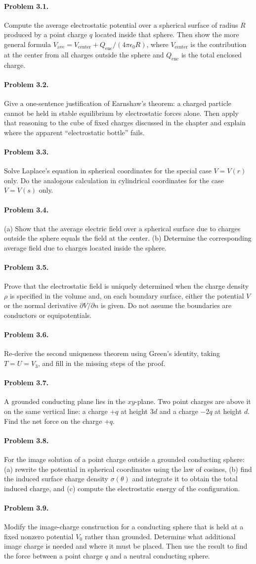 \documentclass{aa}
\newcommand{\problemstatement}[2]{%
\paragraph{Problem #1.}#2\par\medskip
}
\begin{document}
\problemstatement{3.1}{Compute the average electrostatic potential over a spherical surface of radius \(R\) produced by a point charge \(q\) located inside that sphere. Then show the more general formula \(V_{\mathrm{ave}} = V_{\mathrm{center}} + Q_{\mathrm{enc}}/(4\pi\epsilon_0 R)\), where \(V_{\mathrm{center}}\) is the contribution at the center from all charges outside the sphere and \(Q_{\mathrm{enc}}\) is the total enclosed charge.}
\problemstatement{3.2}{Give a one-sentence justification of Earnshaw's theorem: a charged particle cannot be held in stable equilibrium by electrostatic forces alone. Then apply that reasoning to the cube of fixed charges discussed in the chapter and explain where the apparent ``electrostatic bottle'' fails.}
\problemstatement{3.3}{Solve Laplace's equation in spherical coordinates for the special case \(V = V(r)\) only. Do the analogous calculation in cylindrical coordinates for the case \(V = V(s)\) only.}
\problemstatement{3.4}{(a) Show that the average electric field over a spherical surface due to charges outside the sphere equals the field at the center. (b) Determine the corresponding average field due to charges located inside the sphere.}
\problemstatement{3.5}{Prove that the electrostatic field is uniquely determined when the charge density \(\rho\) is specified in the volume and, on each boundary surface, either the potential \(V\) or the normal derivative \(\partial V/\partial n\) is given. Do not assume the boundaries are conductors or equipotentials.}
\problemstatement{3.6}{Re-derive the second uniqueness theorem using Green's identity, taking \(T = U = V_3\), and fill in the missing steps of the proof.}
\problemstatement{3.7}{A grounded conducting plane lies in the \(xy\)-plane. Two point charges are above it on the same vertical line: a charge \(+q\) at height \(3d\) and a charge \(-2q\) at height \(d\). Find the net force on the charge \(+q\).}
\problemstatement{3.8}{For the image solution of a point charge outside a grounded conducting sphere: (a) rewrite the potential in spherical coordinates using the law of cosines, (b) find the induced surface charge density \(\sigma(\theta)\) and integrate it to obtain the total induced charge, and (c) compute the electrostatic energy of the configuration.}
\problemstatement{3.9}{Modify the image-charge construction for a conducting sphere that is held at a fixed nonzero potential \(V_0\) rather than grounded. Determine what additional image charge is needed and where it must be placed. Then use the result to find the force between a point charge \(q\) and a neutral conducting sphere.}
\end{document}
